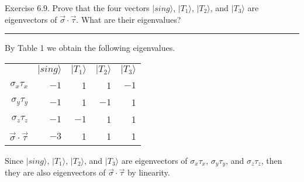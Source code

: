 \documentclass[12pt]{article}
\begin{document}
Exercise 6.9.
Prove that the four vectors $|sing\rangle$, $|T_1\rangle$,
$|T_2\rangle$, and $|T_3\rangle$ are eigenvectors of
$\vec\sigma\cdot\vec\tau$.
What are their eigenvalues?

\bigskip
\hrule

\bigskip
By Table 1 we obtain the following eigenvalues.
\begin{center}
\begin{tabular}{rrrrr}
& $|sing\rangle$ & $|T_1\rangle$ & $|T_2\rangle$ & $|T_3\rangle$
\\[1ex]
$\sigma_x\tau_x$ & $-1$ & 1 & 1 & $-1$
\\
$\sigma_y\tau_y$ & $-1$ & 1 & $-1$ & 1
\\
$\sigma_z\tau_z$ & $-1$ & $-1$ & 1 & 1
\\[1ex]
$\vec\sigma\cdot\vec\tau$ & $-3$ & 1 & 1 & 1
\end{tabular}
\end{center}

Since $|sing\rangle$, $|T_1\rangle$, $|T_2\rangle$, and $|T_3\rangle$ are eigenvectors of
$\sigma_x\tau_x$, $\sigma_y\tau_y$, and $\sigma_z\tau_z$,
then they are also eigenvectors of $\vec\sigma\cdot\vec\tau$ by linearity.
\end{document}
